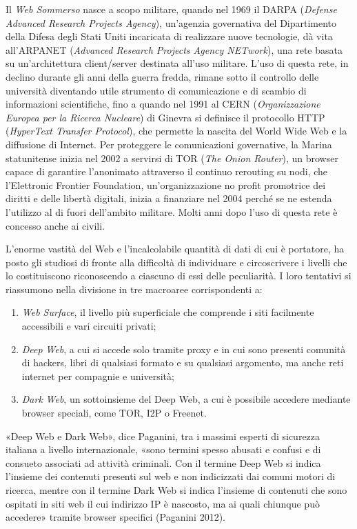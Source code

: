 {Il \emph{Web Sommerso} nasce a scopo militare, quando nel 1969 il DARPA
(\emph{Defense Advanced Research Projects Agency}), un'agenzia
governativa del Dipartimento della Difesa degli Stati Uniti incaricata
di realizzare nuove tecnologie, dà vita all'ARPANET (\emph{Advanced
Research Projects Agency NETwork}), una rete basata su un'architettura
client/server destinata all'uso militare. L'uso di questa rete, in
declino durante gli anni della guerra fredda, rimane sotto il controllo
delle università diventando utile strumento di comunicazione e di
scambio di informazioni scientifiche, fino a quando nel 1991 al CERN
(\emph{Organizzazione Europea per la Ricerca Nucleare}) di Ginevra si
definisce il protocollo HTTP (\emph{HyperText Transfer Protocol}), che
permette la nascita del World Wide Web e la diffusione di Internet. Per
proteggere le comunicazioni governative, la Marina statunitense inizia
nel 2002 a servirsi di TOR (\emph{The Onion Router}), un browser capace
di garantire l'anonimato attraverso il continuo rerouting su nodi, che
l'Elettronic Frontier Foundation, un'organizzazione no profit promotrice
dei diritti e delle libertà digitali, inizia a finanziare nel 2004
perché se ne estenda l'utilizzo al di fuori dell'ambito militare. Molti
anni dopo l'uso di questa rete è concesso anche ai civili.

L'enorme vastità del Web e l'incalcolabile quantità di dati di cui è
portatore, ha posto gli studiosi di fronte alla difficoltà di
individuare e circoscrivere i livelli che lo costituiscono riconoscendo
a ciascuno di essi delle peculiarità. I loro tentativi si riassumono
nella divisione in tre macroaree corrispondenti a:

\begin{enumerate}
\def\labelenumi{\arabic{enumi}.}
\item
  \emph{Web Surface}, il livello più superficiale che comprende i siti
  facilmente accessibili e vari circuiti privati;
\item
  \emph{Deep} \emph{Web}, a cui si accede solo tramite proxy e in cui
  sono presenti comunità di hackers, libri di qualsiasi formato e su
  qualsiasi argomento, ma anche reti internet per compagnie e
  università;
\item
  \emph{Dark} \emph{Web}, un sottoinsieme del Deep Web, a cui è
  possibile accedere mediante browser speciali, come TOR, I2P o Freenet.
\end{enumerate}

«Deep Web e Dark Web», dice Paganini, tra i massimi esperti di sicurezza
italiana a livello internazionale, «sono termini spesso abusati e
confusi e di consueto associati ad attività criminali. Con il termine
Deep Web si indica l'insieme dei contenuti presenti sul web e non
indicizzati dai comuni motori di ricerca, mentre con il termine Dark Web
si indica l'insieme di contenuti che sono ospitati in siti web il cui
indirizzo IP è nascosto, ma ai quali chiunque può accedere» tramite
browser specifici (Paganini 2012).

}
